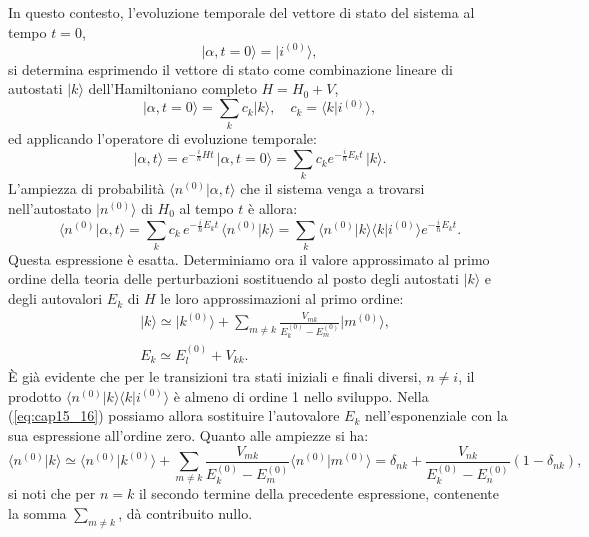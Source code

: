 \documentclass[a4paper,12pt,oneside]{book}
\begin{document}
In questo contesto, l'evoluzione temporale del vettore di stato del sistema al tempo $t=0$,
	\begin{equation}
		\vert \alpha , t=0 \rangle = \vert i^{(0)} \rangle ,
	\end{equation}
si determina esprimendo il vettore di stato come combinazione lineare di autostati $\vert k \rangle $ dell'Hamiltoniano completo $H=H_0 +V$,
	\begin{equation}
	\vert \alpha , t=0\rangle = \sum _k c_k \vert k \rangle , \quad c_k = \langle k \vert i^{(0)} \rangle ,
	\end{equation}
ed applicando l'operatore di evoluzione temporale:
	\begin{equation}
		\vert \alpha , t \rangle = e^{-\frac{i}{\hbar} H t}\, \vert \alpha , t=0\rangle = \sum _k c_k e^{-\frac{i}{\hbar} E_k t }\, \vert k \rangle .
	\end{equation}
L'ampiezza di probabilità $\langle n^{(0)} \vert \alpha , t \rangle $ che il sistema venga a trovarsi nell'autostato $\vert n^{(0)} \rangle $ di $H_0$ al tempo $t$ è allora:
	\begin{equation}
		\langle n^{(0)} \vert \alpha , t \rangle = \sum _k  c_k\, e^{-\frac{i}{\hbar} E_k t}\, \langle n^{(0)} \vert k \rangle = \sum _k \langle n^{(0)} \vert k \rangle \langle k \vert i^{(0)} \rangle e^{-\frac{i}{\hbar}E_k t}.
	\label{eq:cap15_16}
	\end{equation}
Questa espressione è esatta. Determiniamo ora il valore approssimato al primo ordine della teoria delle perturbazioni sostituendo al posto degli autostati $\vert k \rangle $ e degli autovalori $E_k$ di $H$ le loro approssimazioni al primo ordine:
	\begin{align}
		&\vert k \rangle \simeq \vert k^{(0)} \rangle + \sum _{m\neq k} \frac{V_{mk}}{E_k ^{(0)} - E_m ^{(0)}}\vert m ^{(0)} \rangle ,\\
	 	&E_k \simeq E_l ^{(0)} +V_{kk} .
	\end{align}
È già evidente che per le transizioni tra stati iniziali e finali diversi, $n\neq i$, il prodotto $\langle n^{(0)} \vert k \rangle \langle k \vert i^{(0)} \rangle$ è almeno di ordine 1 nello sviluppo. Nella (\ref{eq:cap15_16}) possiamo allora sostituire l'autovalore $E_k$ nell'esponenziale con la sua espressione all'ordine zero. Quanto alle ampiezze si ha:
	\begin{equation}
		\langle n^{(0)} \vert k \rangle \simeq \langle n^{(0)} \vert k^{(0)} \rangle + \sum _{m\neq k} \frac{V_{mk}}{E_k ^{(0)}-E_m ^{(0)}} \langle n^{(0)} \vert m^{(0)} \rangle = \delta _{nk} + \frac{V_{nk}}{E_k ^{(0)} - E_n ^{(0)}}\left( 1-\delta _{nk} \right),
	\label{eq:cap15_17}	
	\end{equation}
si noti che per $n=k$ il secondo termine della precedente espressione, contenente la somma $\displaystyle{\sum _{m\neq k }}$, dà contribuito nullo.\\
\end{document}

